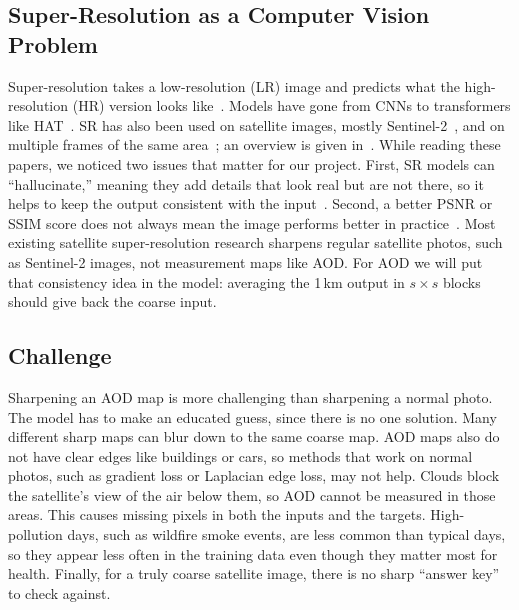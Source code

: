 \documentclass[conference]{IEEEtran}
\begin{document}
\subsection{Super-Resolution as a Computer Vision Problem}
Super-resolution takes a low-resolution (LR) image and predicts what the high-resolution (HR) version looks like~\cite{wang2021survey}. Models have gone from CNNs to transformers like HAT~\cite{chen2023hat}. SR has also been used on satellite images, mostly Sentinel-2~\cite{lanaras2018dsen2,nguyenvi2025channel,massarelli2026interp}, and on multiple frames of the same area~\cite{deudon2020highresnet}; an overview is given in~\cite{digitalsense_blog}. While reading these papers, we noticed two issues that matter for our project. First, SR models can ``hallucinate,'' meaning they add details that look real but are not there, so it helps to keep the output consistent with the input~\cite{aybar2026sen2sr,massarelli2026interp}. Second, a better PSNR or SSIM score does not always mean the image performs better in practice~\cite{shermeyer2019effects}. Most existing satellite super-resolution research sharpens regular satellite photos, such as Sentinel-2 images, not measurement maps like AOD. For AOD we will put that consistency idea in the model: averaging the 1\,km output in $s\times s$ blocks should give back the coarse input.
\subsection{Challenge}
Sharpening an AOD map is more challenging than sharpening a normal photo. The model has to make an educated guess, since there is no one solution. Many different sharp maps can blur down to the same coarse map. AOD maps also do not have clear edges like buildings or cars, so methods that work on normal photos, such as gradient loss or Laplacian edge loss, may not help. Clouds block the satellite's view of the air below them, so AOD cannot be measured in those areas. This causes missing pixels in both the inputs and the targets. High-pollution days, such as wildfire smoke events, are less common than typical days, so they appear less often in the training data even though they matter most for health. Finally, for a truly coarse satellite image, there is no sharp ``answer key'' to check against.
\end{document}
